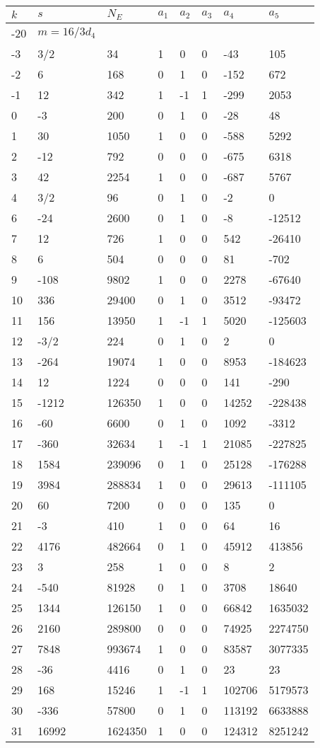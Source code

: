 \documentclass{amsart}
\begin{document}
\begin{longtable}{|l|l|l|lllll|}
\hline
$k$ & $s$ & $N_E$ & $a_1$ & $a_2$ & $a_3$ & $a_4$ & $a_5$\\
\hline
-20&$m=16/3d_{4}$&&\multicolumn{5}{c|}{}\\
-3&3/2&34&1&0&0&-43&105\\
-2&6&168&0&1&0&-152&672\\
-1&12&342&1&-1&1&-299&2053\\
0&-3&200&0&1&0&-28&48\\
1&30&1050&1&0&0&-588&5292\\
2&-12&792&0&0&0&-675&6318\\
3&42&2254&1&0&0&-687&5767\\
4&3/2&96&0&1&0&-2&0\\
6&-24&2600&0&1&0&-8&-12512\\
7&12&726&1&0&0&542&-26410\\
8&6&504&0&0&0&81&-702\\
9&-108&9802&1&0&0&2278&-67640\\
10&336&29400&0&1&0&3512&-93472\\
11&156&13950&1&-1&1&5020&-125603\\
12&-3/2&224&0&1&0&2&0\\
13&-264&19074&1&0&0&8953&-184623\\
14&12&1224&0&0&0&141&-290\\
15&-1212&126350&1&0&0&14252&-228438\\
16&-60&6600&0&1&0&1092&-3312\\
17&-360&32634&1&-1&1&21085&-227825\\
18&1584&239096&0&1&0&25128&-176288\\
19&3984&288834&1&0&0&29613&-111105\\
20&60&7200&0&0&0&135&0\\
21&-3&410&1&0&0&64&16\\
22&4176&482664&0&1&0&45912&413856\\
23&3&258&1&0&0&8&2\\
24&-540&81928&0&1&0&3708&18640\\
25&1344&126150&1&0&0&66842&1635032\\
26&2160&289800&0&0&0&74925&2274750\\
27&7848&993674&1&0&0&83587&3077335\\
28&-36&4416&0&1&0&23&23\\
29&168&15246&1&-1&1&102706&5179573\\
30&-336&57800&0&1&0&113192&6633888\\
31&16992&1624350&1&0&0&124312&8251242\\

\end{longtable}
\end{document}
